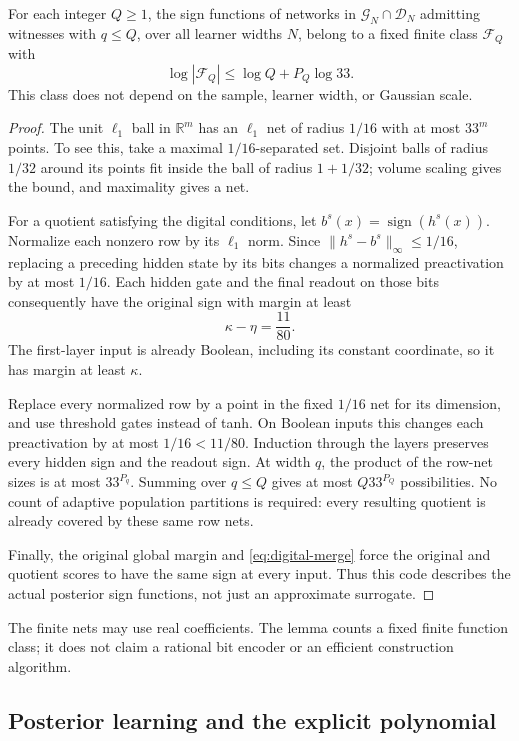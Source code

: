 \begin{lemma}\label{lem:digital-code}
For each integer $Q\ge1$, the sign functions of networks in
$\mathcal G_N\cap\mathcal D_N$ admitting witnesses with $q\le Q$, over
all learner widths $N$, belong to a fixed finite class $\mathcal F_Q$
with
\[
 \log|\mathcal F_Q|\le\log Q+P_Q\log33.
\]
This class does not depend on the sample, learner width, or Gaussian scale.
\end{lemma}
\begin{proof}
The unit $\ell_1$ ball in $\mathbb R^m$ has an $\ell_1$ net of radius
$1/16$ with at most $33^m$ points.  To see this, take a maximal
$1/16$-separated set.  Disjoint balls of radius $1/32$ around its points
fit inside the ball of radius $1+1/32$; volume scaling gives the bound,
and maximality gives a net.

For a quotient satisfying the digital conditions, let
$b^s(x)=\operatorname{sign}(h^s(x))$.  Normalize each nonzero row by its
$\ell_1$ norm.  Since $\|h^s-b^s\|_\infty\le1/16$, replacing a preceding
hidden state by its bits changes a normalized preactivation by at most
$1/16$.  Each hidden gate and the final readout on those bits consequently
have the original sign with margin at least
\[
 \kappa-\eta=\frac{11}{80}.
\]
The first-layer input is already Boolean, including its constant
coordinate, so it has margin at least $\kappa$.

Replace every normalized row by a point in the fixed $1/16$ net for its
dimension, and use threshold gates instead of tanh.  On Boolean inputs
this changes each preactivation by at most $1/16<11/80$.  Induction through
the layers preserves every hidden sign and the readout sign.  At width
$q$, the product of the row-net sizes is at most $33^{P_q}$.  Summing over
$q\le Q$ gives at most $Q33^{P_Q}$ possibilities.  No count of adaptive
population partitions is required: every resulting quotient is already
covered by these same row nets.

Finally, the original global margin and
\eqref{eq:digital-merge} force the original and quotient scores to have
the same sign at every input.  Thus this code describes the actual
posterior sign functions, not just an approximate surrogate.
\end{proof}

The finite nets may use real coefficients.  The lemma counts a fixed
finite function class; it does not claim a rational bit encoder or an
efficient construction algorithm.

\subsection{Posterior learning and the explicit polynomial}

